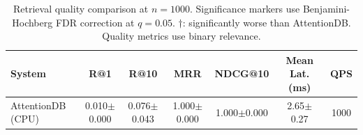 \begin{table}[htbp]
\centering
\caption{Retrieval quality comparison at $n=1000$. Significance markers use Benjamini-Hochberg FDR correction at $q=0.05$. $\dagger$: significantly worse than AttentionDB. Quality metrics use binary relevance.}
\label{tab:main}
\begin{tabular}{lcccccc}
\toprule
System & R@1 & R@10 & MRR & NDCG@10 & Mean Lat. (ms) & QPS \\
\midrule
AttentionDB (CPU) & 0.010$\pm$0.000 & 0.076$\pm$0.043 & 1.000$\pm$0.000 & 1.000$\pm$0.000 & 2.65$\pm$0.27 & 1000 \\
\bottomrule
\end{tabular}
\end{table}
